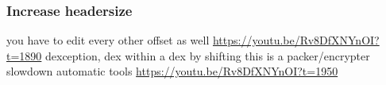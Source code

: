 \subsubsection{Increase headersize}\label{subsubsection:counter-reengineering-break-headersize}
you have to edit every other offset as well\newline
\url{https://youtu.be/Rv8DfXNYnOI?t=1890}\newline
dexception, dex within a dex by shifting\newline
this is a packer/encrypter\newline
slowdown automatic tools\newline
\url{https://youtu.be/Rv8DfXNYnOI?t=1950}\newline
